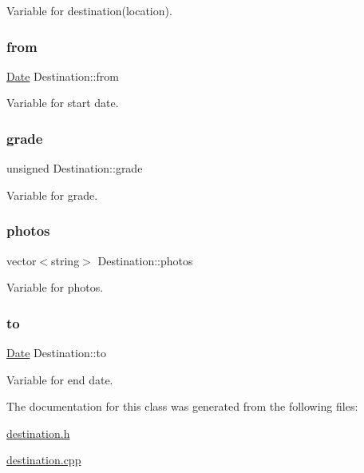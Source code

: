 Variable for destination(location). \mbox{\label{class_destination_a0dea129cf2457e922c57b7fb5996509a}} 
\subsubsection{\texorpdfstring{from}{from}}
{\footnotesize\ttfamily \hyperlink{class_date}{Date} Destination\+::from\hspace{0.3cm}{\ttfamily [private]}}

Variable for start date. \mbox{\label{class_destination_afbab7d354ba8c639501755e48261012e}} 
\subsubsection{\texorpdfstring{grade}{grade}}
{\footnotesize\ttfamily unsigned Destination\+::grade\hspace{0.3cm}{\ttfamily [private]}}

Variable for grade. \mbox{\label{class_destination_a17cb8de845ce9d65eb7082c79c617444}} 
\subsubsection{\texorpdfstring{photos}{photos}}
{\footnotesize\ttfamily vector$<$string$>$ Destination\+::photos\hspace{0.3cm}{\ttfamily [private]}}

Variable for photos. \mbox{\label{class_destination_ad556f5592b3bcb4ab407064bc1f0763c}} 
\subsubsection{\texorpdfstring{to}{to}}
{\footnotesize\ttfamily \hyperlink{class_date}{Date} Destination\+::to\hspace{0.3cm}{\ttfamily [private]}}

Variable for end date. 

The documentation for this class was generated from the following files\+:\begin{DoxyCompactItemize}
\item 
\hyperlink{destination_8h}{destination.\+h}\item 
\hyperlink{destination_8cpp}{destination.\+cpp}\end{DoxyCompactItemize}
